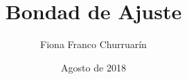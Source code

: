 \documentclass[10pt]{article}
\begin{document}
\title{Bondad de Ajuste}
\author{Fiona Franco Churruar\'in}
\date{Agosto de 2018}
\maketitle
\end{document}
